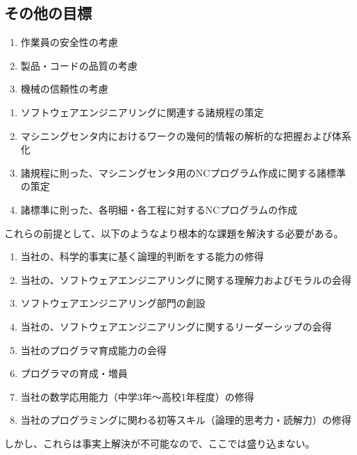 \subsection{その他の目標}
\begin{enumerate}[label=\sarrow]
\item 作業員の安全性の考慮
\item 製品・コードの品質の考慮
\item 機械の信頼性の考慮
\end{enumerate}



\clearpage
\begin{enumerate}[label=\sarrow]
\item ソフトウェアエンジニアリングに関連する諸規程の策定
\item マシニングセンタ内におけるワークの幾何的情報の解析的な把握および体系化
\item 諸規程に則った、マシニングセンタ用のNCプログラム作成に関する諸標準の策定
\item 諸標準に則った、各明細・各工程に対するNCプログラムの作成
\end{enumerate}
\begin{hosoku}
これらの前提として、以下のようなより根本的な課題を解決する必要がある。
\begin{enumerate}[label=\sarrow]
\item[{\sarrow[red]}] 当社の、科学的事実に基く論理的判断をする能力の修得
\item[{\sarrow[red]}] 当社の、ソフトウェアエンジニアリングに関する理解力およびモラルの会得
\item[{\sarrow[red]}] ソフトウェアエンジニアリング部門の創設
\item[{\sarrow[red]}] 当社の、ソフトウェアエンジニアリングに関するリーダーシップの会得
\item[{\sarrow[red]}] 当社のプログラマ育成能力の会得
\item[{\sarrow[red]}] プログラマの育成・増員
\item[{\sarrow[red]}] 当社の数学応用能力（中学3年～高校1年程度）の修得
\item[{\sarrow[red]}] 当社のプログラミングに関わる初等スキル（論理的思考力・読解力）の修得
\end{enumerate}
しかし、これらは事実上解決が不可能なので、ここでは盛り込まない。
\end{hosoku}


